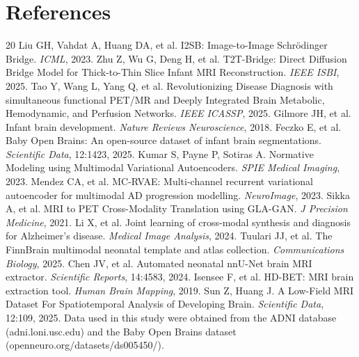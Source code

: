 \documentclass[11pt,a4paper]{article}
\begin{document}
\section{References}
\begin{thebibliography}{20}
 Liu GH, Vahdat A, Huang DA, et al. I2SB: Image-to-Image Schr\"odinger Bridge. \textit{ICML}, 2023.
 Zhu Z, Wu G, Deng H, et al. T2T-Bridge: Direct Diffusion Bridge Model for Thick-to-Thin Slice Infant MRI Reconstruction. \textit{IEEE ISBI}, 2025.
 Tao Y, Wang L, Yang Q, et al. Revolutionizing Disease Diagnosis with simultaneous functional PET/MR and Deeply Integrated Brain Metabolic, Hemodynamic, and Perfusion Networks. \textit{IEEE ICASSP}, 2025.
 Gilmore JH, et al. Infant brain development. \textit{Nature Reviews Neuroscience}, 2018.
 Feczko E, et al. Baby Open Brains: An open-source dataset of infant brain segmentations. \textit{Scientific Data}, 12:1423, 2025.
 Kumar S, Payne P, Sotiras A. Normative Modeling using Multimodal Variational Autoencoders. \textit{SPIE Medical Imaging}, 2023.
 Mendez CA, et al. MC-RVAE: Multi-channel recurrent variational autoencoder for multimodal AD progression modelling. \textit{NeuroImage}, 2023.
 Sikka A, et al. MRI to PET Cross-Modality Translation using GLA-GAN. \textit{J Precision Medicine}, 2021.
 Li X, et al. Joint learning of cross-modal synthesis and diagnosis for Alzheimer's disease. \textit{Medical Image Analysis}, 2024.
 Tuulari JJ, et al. The FinnBrain multimodal neonatal template and atlas collection. \textit{Communications Biology}, 2025.
 Chen JV, et al. Automated neonatal nnU-Net brain MRI extractor. \textit{Scientific Reports}, 14:4583, 2024.
 Isensee F, et al. HD-BET: MRI brain extraction tool. \textit{Human Brain Mapping}, 2019.
 Sun Z, Huang J. A Low-Field MRI Dataset For Spatiotemporal Analysis of Developing Brain. \textit{Scientific Data}, 12:109, 2025.
 Data used in this study were obtained from the ADNI database (adni.loni.usc.edu) and the Baby Open Brains dataset (openneuro.org/datasets/ds005450/).
\end{thebibliography}
\end{document}
